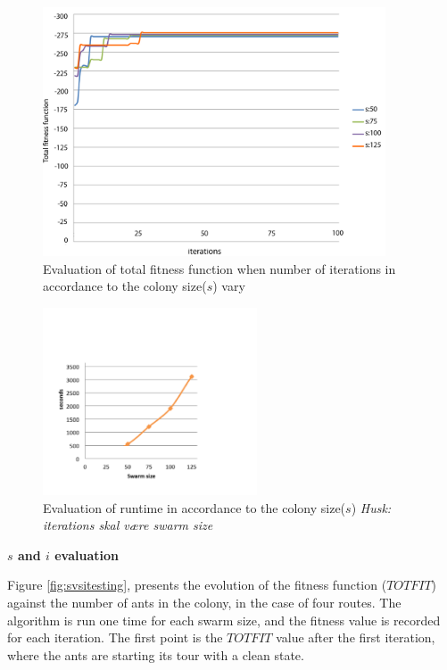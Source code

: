 
\begin{figure}[H]
\begin{center}
  \includegraphics[width=4in]{assets/svsitest.png}
  \end{center}
  \caption{Evaluation of total fitness function when number of iterations in accordance to the colony size($s$) vary}
  \label{fig:svsitesting} 
\end{figure}

\begin{figure}[H]
\begin{center}
  \includegraphics[width=2.5in]{assets/svsiruntime.png}
  \end{center}
  \caption{Evaluation of runtime in accordance to the colony size($s$) \emph{\color{blue} Husk: iterations skal være swarm size}}
  \label{fig:svsiruntime} 
\end{figure}

\textbf{$s$ and $i$ evaluation}
\newline

Figure \vref{fig:svsitesting}, presents the evolution of the fitness function ($TOTFIT$) against the number of ants in the colony, in the case of four routes. The algorithm is run one time for each swarm size, and the fitness value is recorded for each iteration. The first point is the $TOTFIT$ value after the first iteration, where the ants are starting its tour with a clean state.

